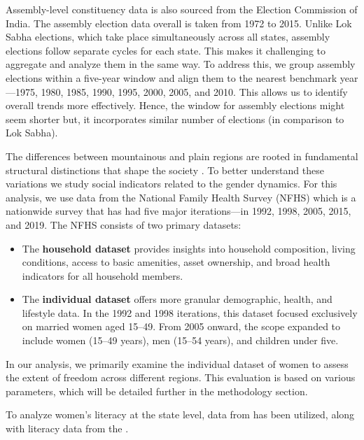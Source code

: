 Assembly-level constituency data is also sourced from the Election Commission of India. The assembly election data overall is taken from 1972 to 2015. Unlike Lok Sabha elections, which take place simultaneously across all states, assembly elections follow separate cycles for each state. This makes it challenging to aggregate and analyze them in the same way. To address this, we group assembly elections within a five-year window and align them to the nearest benchmark year—1975, 1980, 1985, 1990, 1995, 2000, 2005, and 2010. This allows us to identify overall trends more effectively. Hence, the window for assembly elections might seem shorter but, it incorporates similar number of elections (in comparison to Lok Sabha).

\vspace{0.3 cm}

The differences between mountainous and plain regions  are rooted in fundamental structural distinctions that shape the society \citep{jamesscott}. To better understand these variations we study social indicators related to the gender dynamics. For this analysis, we use data from the National Family Health Survey (NFHS) which is a  nationwide survey that has had five major iterations—in 1992, 1998, 2005, 2015, and 2019. The NFHS consists of two primary datasets: 

\begin{itemize}
    \item The \textbf{household dataset} provides insights into household composition, living conditions, access to basic amenities, asset ownership, and broad health indicators for all household members.
\item The \textbf{individual dataset} offers more granular demographic, health, and lifestyle data. In the 1992 and 1998 iterations, this dataset focused exclusively on married women aged 15–49. From 2005 onward, the scope expanded to include women (15–49 years), men (15–54 years), and children under five.
\end{itemize}

In our analysis, we primarily examine the individual dataset of women to assess the extent of freedom across different regions. This evaluation is based on various parameters, which will be detailed further in the methodology section.

\vspace{0.3 cm}

To analyze women's literacy at the state level, data from \cite{census1991,census2001,census2011} has been utilized, along with literacy data from the \cite{NSC2017}.

